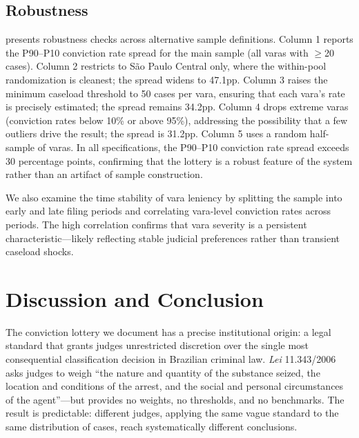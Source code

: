 \documentclass[12pt]{article}
\begin{document}
\subsection{Robustness}



 presents robustness checks across alternative sample definitions. Column 1 reports the P90--P10 conviction rate spread for the main sample (all varas with $\geq$20 cases). Column 2 restricts to S\~ao Paulo Central only, where the within-pool randomization is cleanest; the spread widens to 47.1pp. Column 3 raises the minimum caseload threshold to 50 cases per vara, ensuring that each vara's rate is precisely estimated; the spread remains 34.2pp. Column 4 drops extreme varas (conviction rates below 10\% or above 95\%), addressing the possibility that a few outliers drive the result; the spread is 31.2pp. Column 5 uses a random half-sample of varas. In all specifications, the P90--P10 conviction rate spread exceeds 30 percentage points, confirming that the lottery is a robust feature of the system rather than an artifact of sample construction.

We also examine the time stability of vara leniency by splitting the sample into early and late filing periods and correlating vara-level conviction rates across periods. The high correlation confirms that vara severity is a persistent characteristic---likely reflecting stable judicial preferences rather than transient caseload shocks.

\section{Discussion and Conclusion}

The conviction lottery we document has a precise institutional origin: a legal standard that grants judges unrestricted discretion over the single most consequential classification decision in Brazilian criminal law. \textit{Lei} 11.343/2006 asks judges to weigh ``the nature and quantity of the substance seized, the location and conditions of the arrest, and the social and personal circumstances of the agent''---but provides no weights, no thresholds, and no benchmarks. The result is predictable: different judges, applying the same vague standard to the same distribution of cases, reach systematically different conclusions.
\end{document}
